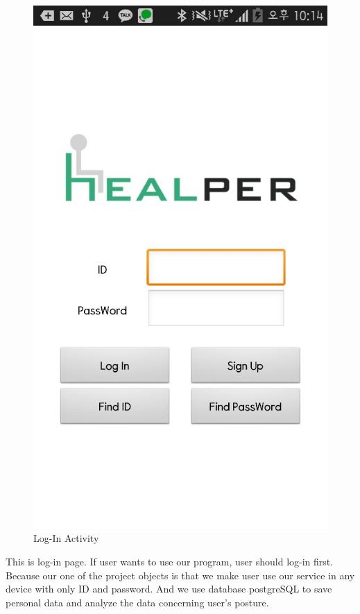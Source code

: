 \documentclass[conference]{IEEEtran}
\begin{document}
\begin{figure}[H]
\begin{center}
    \includegraphics[scale=0.4]{login}
    \caption{Log-In Activity} 
\end{center}
\end{figure}

This is log-in page. If user wants to use our program, user should log-in first. Because our one of the project objects is that we make user use our service in any device with only ID and password. And we use database postgreSQL to save personal data and analyze the data concerning user's posture.
\end{document}
